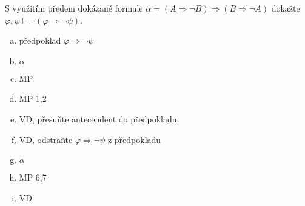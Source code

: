 S využitím předem dokázané formule $\alpha = (A \Rightarrow \neg B) \Rightarrow (B \Rightarrow \neg A)$ dokažte $\varphi, \psi \vdash \neg(\varphi \Rightarrow \neg \psi)$.
\begin{enumerate}[a)]
	\item předpoklad $\varphi \Rightarrow \neg \psi$
	\item $\alpha$
	\item MP
	\item MP 1,2
	\item VD, přesuňte antecendent do předpokladu
	\item VD, odstraňte $\varphi \Rightarrow \neg \psi$ z předpokladu
	\item $\alpha$
	\item MP 6,7
	\item VD
\end{enumerate}

